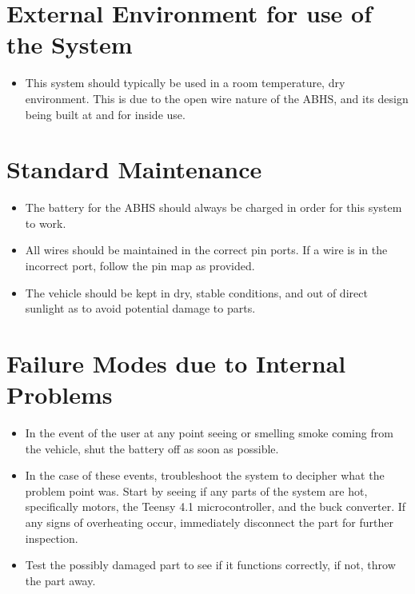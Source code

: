 \documentclass[11pt]{report}
\begin{document}
\section {External Environment for use of the System}
\begin{itemize}
    \item This system should typically be used in a room temperature, dry environment. This is due to the open wire nature of the \gls{ABHS}, and its design being built at and for inside use.
\end{itemize}
\section{Standard Maintenance}
\begin{itemize}
    \item The battery for the \gls{ABHS} should always be charged in order for this system to work.
    \item All wires should be maintained in the correct pin ports. If a wire is in the incorrect port, follow the pin map as provided.
    \item The vehicle should be kept in dry, stable conditions, and out of direct sunlight as to avoid potential damage to parts.
\end{itemize}
\section{Failure Modes due to Internal Problems}
\begin{itemize}
    \item In the event of the user at any point seeing or smelling smoke coming from the vehicle, shut the battery off as soon as possible. 
    \item In the case of these events, troubleshoot the system to decipher what the problem point was. Start by seeing if any parts of the system are hot, specifically motors, the Teensy 4.1 microcontroller, and the buck converter. If any signs of overheating occur, immediately disconnect the part for further inspection.
    \item Test the possibly damaged part to see if it functions correctly, if not, throw the part away.
\end{itemize}
\end{document}
